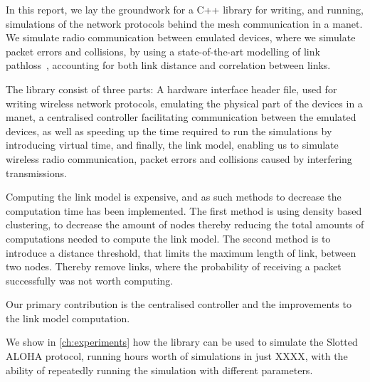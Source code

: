 In this report, we lay the groundwork for a C++ library for writing, and running, simulations of the network protocols behind the mesh communication in a \gls{manet}. We simulate radio communication between emulated devices, where we simulate packet errors and collisions, by using a state-of-the-art modelling of link \gls{pathloss}~\cite{paper:linkmodel}, accounting for both link distance and correlation between links. \smallbreak

The library consist of three parts: A hardware interface header file, used for writing wireless network protocols, emulating the physical part of the devices in a \gls{manet}, a centralised controller facilitating communication between the emulated devices, as well as speeding up the time required to run the simulations by introducing virtual time, and finally, the link model, enabling us to simulate wireless radio communication, packet errors and collisions caused by interfering transmissions.\smallbreak

Computing the link model is expensive, and as such methods to decrease the computation time has been implemented. The first method is using density based clustering, to decrease the amount of nodes thereby reducing the total amounts of computations needed to compute the link model. The second method is to introduce a distance threshold, that limits the maximum length of link, between two nodes. Thereby remove links, where the probability of receiving a packet successfully was not worth computing.\smallbreak

Our primary contribution is the centralised controller and the improvements to the link model computation.

We show in \autoref{ch:experiments} how the library can be used to simulate the Slotted ALOHA protocol, running hours worth of simulations in just XXXX, with the ability of repeatedly running the simulation with different parameters.\smallbreak



